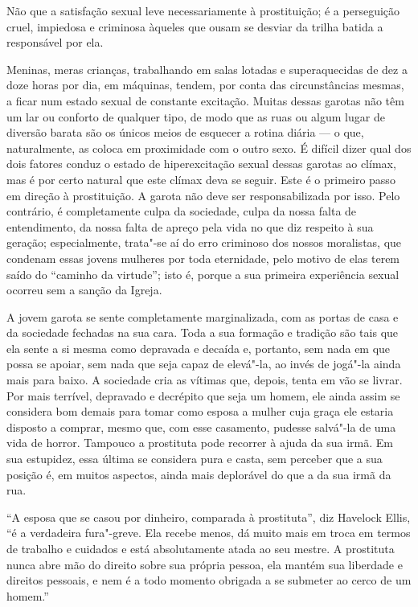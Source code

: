 Não que a satisfação sexual leve necessariamente à prostituição; é a
perseguição cruel, impiedosa e criminosa àqueles que ousam se desviar da
trilha batida a responsável por ela.

Meninas, meras crianças, trabalhando em salas lotadas e superaquecidas
de dez a doze horas por dia, em máquinas, tendem, por conta das
circunstâncias mesmas, a ficar num estado sexual de constante excitação.
Muitas dessas garotas não têm um lar ou conforto de qualquer tipo, de
modo que as ruas ou algum lugar de diversão barata são os únicos meios
de esquecer a rotina diária --- o que, naturalmente, as coloca em
proximidade com o outro sexo. É difícil dizer qual dos dois fatores
conduz o estado de hiperexcitação sexual dessas garotas ao clímax, mas é
por certo natural que este clímax deva se seguir. Este é o primeiro
passo em direção à prostituição. A garota não deve ser responsabilizada
por isso. Pelo contrário, é completamente culpa da sociedade, culpa da
nossa falta de entendimento, da nossa falta de apreço pela vida no que
diz respeito à sua geração; especialmente, trata"-se aí do erro
criminoso dos nossos moralistas, que condenam essas jovens mulheres por
toda eternidade, pelo motivo de elas terem saído do ``caminho da
virtude''; isto é, porque a sua primeira experiência sexual ocorreu sem
a sanção da Igreja.

A jovem garota se sente completamente marginalizada, com as portas de
casa e da sociedade fechadas na sua cara. Toda a sua formação e tradição
são tais que ela sente a si mesma como depravada e decaída e, %
portanto, sem nada em que possa se apoiar, sem nada que seja capaz de
elevá"-la, ao invés de jogá"-la ainda mais para baixo. A sociedade cria as
vítimas que, depois, tenta em vão se livrar. Por mais terrível,
depravado e decrépito que seja um homem, ele ainda assim se considera
bom demais para tomar como esposa a mulher cuja graça ele estaria
disposto a comprar, mesmo que, com esse casamento, pudesse salvá"-la de
uma vida de horror. Tampouco a prostituta pode recorrer à ajuda da sua
irmã. Em sua estupidez, essa última se considera pura e casta, sem
perceber que a sua posição é, em muitos aspectos, ainda mais
deplorável do que a da sua irmã da rua.

``A esposa que se casou por dinheiro, comparada à prostituta'',
diz Havelock Ellis, ``é a verdadeira fura"-greve. Ela recebe menos, dá muito
mais em troca em termos de trabalho e cuidados e está absolutamente
atada ao seu mestre. A prostituta nunca abre mão do direito sobre sua
própria pessoa, ela mantém sua liberdade e direitos pessoais, e nem é a
todo momento obrigada a se submeter ao cerco de um homem.''

